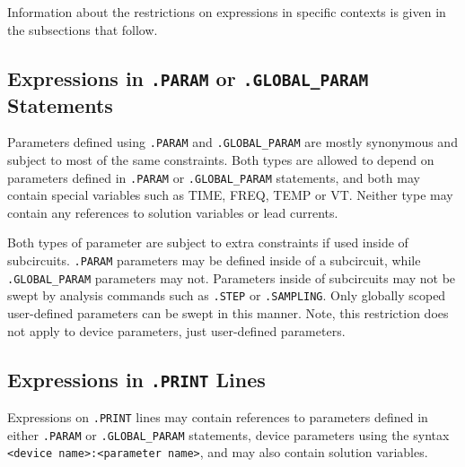 Information about the restrictions on expressions in specific contexts
is given in the subsections that follow.

\subsection{Expressions in \texttt{.PARAM} or \texttt{.GLOBAL\_PARAM} Statements}

Parameters defined using \texttt{.PARAM} and \texttt{.GLOBAL\_PARAM} are 
mostly synonymous and subject to most of the same constraints.
Both types are 
allowed to depend on parameters defined in \texttt{.PARAM} or
\texttt{.GLOBAL\_PARAM} statements, and both may contain special variables
such as \textrm{TIME}, \textrm{FREQ}, \textrm{TEMP} or \textrm{VT}.  Neither type
may contain any references to solution variables or lead currents.



Both types of parameter are subject to extra constraints if used inside of subcircuits.  
\texttt{.PARAM} parameters may be defined inside of a subcircuit, while \texttt{.GLOBAL\_PARAM} 
parameters may not.  Parameters inside of subcircuits may not be swept by 
analysis commands such as \texttt{.STEP} or \texttt{.SAMPLING}.  Only globally 
scoped user-defined parameters can be swept in this manner.  Note, this restriction 
does not apply to device parameters, just user-defined parameters.

\subsection{Expressions in \texttt{.PRINT} Lines}

Expressions on \texttt{.PRINT} lines may contain references to
parameters defined in either \texttt{.PARAM} or
\texttt{.GLOBAL\_PARAM} statements, device parameters using the syntax
\texttt{<device name>:<parameter name>}, and may also contain solution
variables.

\begin{centering}
\end{centering}

